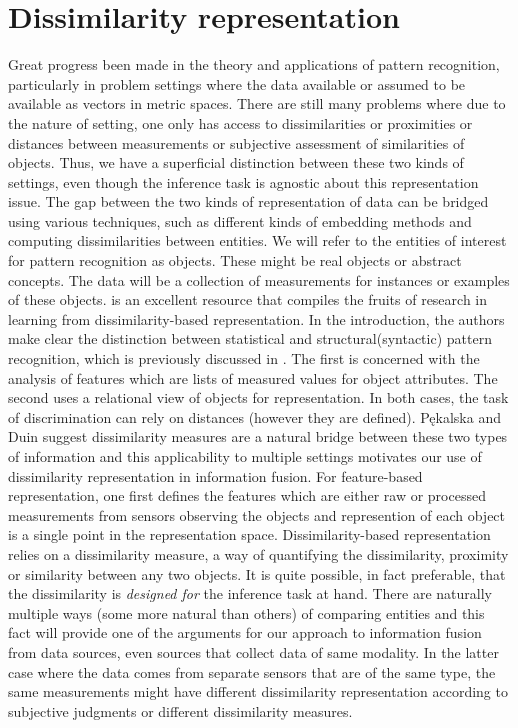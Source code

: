\documentclass[12pt,oneside,final]{thesis}\usepackage[]{graphicx}\usepackage[]{color}
\begin{document}
\section{Dissimilarity representation\label{sec:dissim_repr}}
 Great progress been made in the theory and applications of pattern recognition, particularly in problem settings where the data available or assumed to be available as vectors in metric spaces. There are still many problems where due to the nature of setting, one only has access to dissimilarities or  proximities or distances between measurements or subjective assessment  of similarities of objects. Thus, we have a superficial distinction between these two kinds of settings, even though the inference task is agnostic about this representation issue. The gap between the two kinds of representation of data can be bridged using various  techniques, such as different kinds of embedding methods and computing dissimilarities between entities.
We will refer to the entities of interest for pattern recognition as objects. These might be real objects or abstract concepts. The data will be a collection of measurements for instances or examples of these objects.
 \cite{duin2005dissimilarity} is an excellent resource that compiles the fruits of research in learning from  dissimilarity-based representation. In the introduction, the authors make clear the distinction between statistical and structural(syntactic) pattern recognition, which is previously discussed in \cite{NadlerSmith1993}. The first is concerned with the analysis of features which are lists of measured values for object attributes. The second uses a relational view of objects for representation. In both cases,  the task of discrimination  can rely on distances (however they are defined). P\k{e}kalska and Duin  suggest dissimilarity measures  are a natural bridge between these two types of information and this applicability to  multiple settings motivates our use of dissimilarity representation in information fusion. 
For feature-based representation, one first defines the features which are either raw or processed measurements from sensors observing the objects and  represention of each object is a single point in the representation space. Dissimilarity-based representation relies on a dissimilarity measure, a way of quantifying the dissimilarity, proximity or similarity between any two objects. It is quite possible, in fact preferable, that the dissimilarity is \emph{designed for} the inference task at hand. 
There are naturally multiple ways (some more natural than others) of comparing entities and this fact will provide one of the arguments for our approach to information fusion from  data sources, even sources that collect  data of same modality. In  the latter case where the data comes from separate sensors that are of the same type, the same measurements might have different dissimilarity representation according to subjective judgments or different dissimilarity  measures. 
\end{document}

